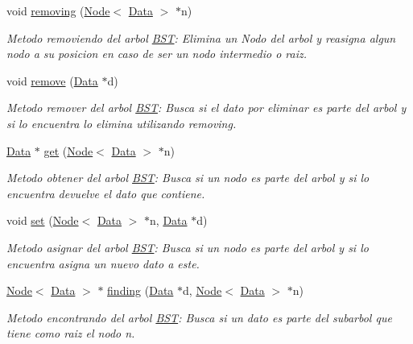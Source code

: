 \begin{DoxyCompactItemize}
void \hyperlink{class_b_s_t_a4832d0c2d2f2b19e5ceba0e8206fc7cf}{removing} (\hyperlink{class_node}{Node}$<$ \hyperlink{class_data}{Data} $>$ $\ast$n)
\begin{DoxyCompactList}\small\item\em Metodo removiendo del arbol \hyperlink{class_b_s_t}{B\+S\+T}\+: Elimina un Nodo del arbol y reasigna algun nodo a su posicion en caso de ser un nodo intermedio o raiz. \end{DoxyCompactList}\item 
void \hyperlink{class_b_s_t_a335d8090d94fe5710a41469452cb9956}{remove} (\hyperlink{class_data}{Data} $\ast$d)
\begin{DoxyCompactList}\small\item\em Metodo remover del arbol \hyperlink{class_b_s_t}{B\+S\+T}\+: Busca si el dato por eliminar es parte del arbol y si lo encuentra lo elimina utilizando removing. \end{DoxyCompactList}\item 
\hyperlink{class_data}{Data} $\ast$ \hyperlink{class_b_s_t_aa60fb93a17547c1fb17aa4d45b74701c}{get} (\hyperlink{class_node}{Node}$<$ \hyperlink{class_data}{Data} $>$ $\ast$n)
\begin{DoxyCompactList}\small\item\em Metodo obtener del arbol \hyperlink{class_b_s_t}{B\+S\+T}\+: Busca si un nodo es parte del arbol y si lo encuentra devuelve el dato que contiene. \end{DoxyCompactList}\item 
void \hyperlink{class_b_s_t_a50ece072ec2fe0c7c4380c0fb4808661}{set} (\hyperlink{class_node}{Node}$<$ \hyperlink{class_data}{Data} $>$ $\ast$n, \hyperlink{class_data}{Data} $\ast$d)
\begin{DoxyCompactList}\small\item\em Metodo asignar del arbol \hyperlink{class_b_s_t}{B\+S\+T}\+: Busca si un nodo es parte del arbol y si lo encuentra asigna un nuevo dato a este. \end{DoxyCompactList}\item 
\hyperlink{class_node}{Node}$<$ \hyperlink{class_data}{Data} $>$ $\ast$ \hyperlink{class_b_s_t_a65295854e5dc764b58c09772a89da2d3}{finding} (\hyperlink{class_data}{Data} $\ast$d, \hyperlink{class_node}{Node}$<$ \hyperlink{class_data}{Data} $>$ $\ast$n)
\begin{DoxyCompactList}\small\item\em Metodo encontrando del arbol \hyperlink{class_b_s_t}{B\+S\+T}\+: Busca si un dato es parte del subarbol que tiene como raiz el nodo n. \end{DoxyCompactList}\item 

\end{DoxyCompactItemize}
